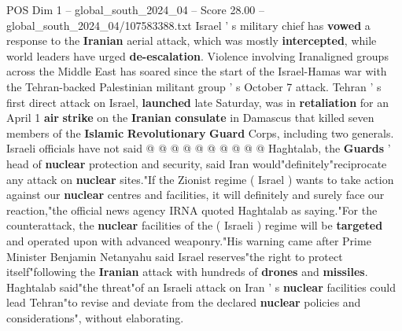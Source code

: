\begin{textsample}{POS Dim 1 – global\_south\_2024\_04 – Score 28.00 – global\_south\_2024\_04/107583388.txt}
Israel ' s military chief has \textbf{vowed} a response to the \textbf{Iranian} aerial attack, which was mostly \textbf{intercepted}, while world leaders have urged \textbf{de-escalation}.
Violence involving Iranaligned groups across the Middle East has soared since the start of the Israel-Hamas war with the Tehran-backed Palestinian militant group ' s October 7 attack.
Tehran ' s first direct attack on Israel, \textbf{launched} late Saturday, was in \textbf{retaliation} for an April 1 \textbf{air} \textbf{strike} on the \textbf{Iranian} \textbf{consulate} in Damascus that killed seven members of the \textbf{Islamic} \textbf{Revolutionary} \textbf{Guard} Corps, including two generals.
Israeli officials have not said @ @ @ @ @ @ @ @ @ @ Haghtalab, the \textbf{Guards} ' head of \textbf{nuclear} protection and security, said Iran would"definitely"reciprocate any attack on \textbf{nuclear} sites."If the Zionist regime ( Israel ) wants to take action against our \textbf{nuclear} centres and facilities, it will definitely and surely face our reaction,"the official news agency IRNA quoted Haghtalab as saying."For the counterattack, the \textbf{nuclear} facilities of the ( Israeli ) regime will be \textbf{targeted} and operated upon with advanced weaponry."His warning came after Prime Minister Benjamin Netanyahu said Israel reserves"the right to protect itself"following the \textbf{Iranian} attack with hundreds of \textbf{drones} and \textbf{missiles}.
Haghtalab said"the threat"of an Israeli attack on Iran ' s \textbf{nuclear} facilities could lead Tehran"to revise and deviate from the declared \textbf{nuclear} policies and considerations", without elaborating.

\end{textsample}
